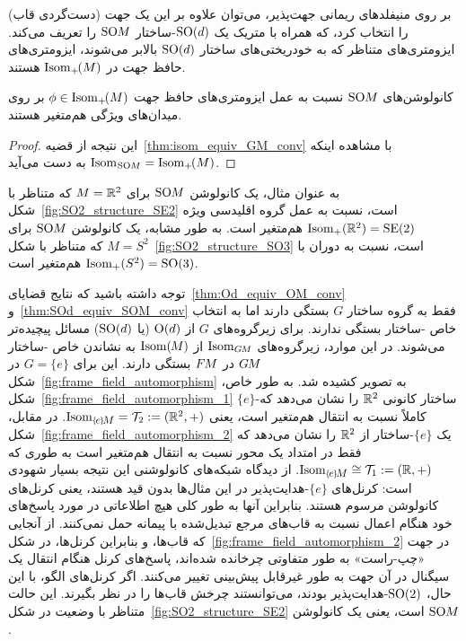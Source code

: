 بر روی منیفلدهای ریمانی جهت‌پذیر، می‌توان علاوه بر این یک جهت (دست‌گردی قاب) را انتخاب کرد، که همراه با متریک یک $\operatorname{SO}(d)$-ساختار $\operatorname{SO}\mkern-3.6muM$ را تعریف می‌کند.
ایزومتری‌های متناظر که به خودریختی‌های ساختار $\operatorname{SO}(d)$ بالابر می‌شوند، ایزومتری‌های حافظ جهت در $\operatorname{Isom}_+\mkern-2mu(M)$ هستند.
\begin{thm}
\label{thm:SOd_equiv_SOM_conv}
    کانولوشن‌های $\operatorname{SO}\mkern-3.6muM$ نسبت به عمل ایزومتری‌های حافظ جهت $\phi \in \operatorname{Isom}_+\mkern-2mu(M)$ بر روی میدان‌های ویژگی هم‌متغیر هستند.
\end{thm}
\begin{proof}
    این نتیجه از قضیه~\eqref{thm:isom_equiv_GM_conv} با مشاهده اینکه $\operatorname{Isom}_{\mkern1mu\operatorname{SO}\mkern-3.6muM} = \operatorname{Isom}_+\mkern-2mu(M)$ به دست می‌آید.
\end{proof}
به عنوان مثال، یک کانولوشن $\operatorname{SO}\mkern-3.6muM$ برای $M=\mathbb{R}^2$ که متناظر با شکل~\ref{fig:SO2_structure_SE2} است، نسبت به عمل گروه اقلیدسی ویژه $\operatorname{Isom}_+(\mathbb{R}^2) = \operatorname{SE}(2)$ هم‌متغیر است.
به طور مشابه، یک کانولوشن $\operatorname{SO}\mkern-3.6muM$ برای $M=S^2$ که متناظر با شکل~\ref{fig:SO2_structure_SO3} است، نسبت به دوران با $\operatorname{Isom}_+(S^2) = \operatorname{SO}(3)$ هم‌متغیر است.


توجه داشته باشید که نتایج قضایای~\ref{thm:Od_equiv_OM_conv} و~\ref{thm:SOd_equiv_SOM_conv} فقط به گروه ساختار $G$ بستگی دارند اما به انتخاب خاص -ساختار بستگی ندارند.
برای زیرگروه‌های $G$ از $\operatorname{O}(d)$ (یا $\operatorname{SO}(d)$) مسائل پیچیده‌تر می‌شوند.
در این موارد، زیرگروه‌های $\operatorname{Isom}_{G\mkern-1.4muM}$ از $\operatorname{Isom}(\mkern-1.5mu M \mkern-.5mu)$ به نشاندن خاص -ساختار $G\mkern-1.4muM$ در $F\mkern-1.5muM$ بستگی دارند.
این برای $G=\{e\}$ در شکل~\ref{fig:frame_field_automorphism} به تصویر کشیده شد.
به طور خاص، شکل~\ref{fig:frame_field_automorphism_1} $\{e\}$-ساختار کانونی $\mathbb{R}^2$ را نشان می‌دهد که کاملاً نسبت به انتقال هم‌متغیر است، یعنی $\IsomeM = \Trans_2 := (\R^2,+)$.
در مقابل، شکل~\ref{fig:frame_field_automorphism_2} یک $\{e\}$-ساختار از $\mathbb{R}^2$ را نشان می‌دهد که فقط در امتداد یک محور نسبت به انتقال هم‌متغیر است به طوری که $\IsomeM \cong \Trans_1 := (\R,+)$.
از دیدگاه شبکه‌های کانولوشنی این نتیجه بسیار شهودی است:
کرنل‌های $\{e\}$-هدایت‌پذیر در این مثال‌ها بدون قید هستند، یعنی کرنل‌های کانولوشن مرسوم هستند.
بنابراین آنها به طور کلی هیچ اطلاعاتی در مورد پاسخ‌های خود هنگام اعمال نسبت به قاب‌های مرجع تبدیل‌شده با پیمانه حمل نمی‌کنند.
از آنجایی که قاب‌ها، و بنابراین کرنل‌ها، در شکل~\ref{fig:frame_field_automorphism_2} در جهت «چپ-راست» به طور متفاوتی چرخانده شده‌اند، پاسخ‌های کرنل هنگام انتقال یک سیگنال در آن جهت به طور غیرقابل پیش‌بینی تغییر می‌کنند.
اگر کرنل‌های الگو، با این حال، $\operatorname{SO}(2)$-هدایت‌پذیر بودند، می‌توانستند چرخش قاب‌ها را در نظر بگیرند.
این حالت متناظر با وضعیت در شکل~\ref{fig:SO2_structure_SE2} است، یعنی یک کانولوشن $\operatorname{SO}\mkern-3.6muM$.